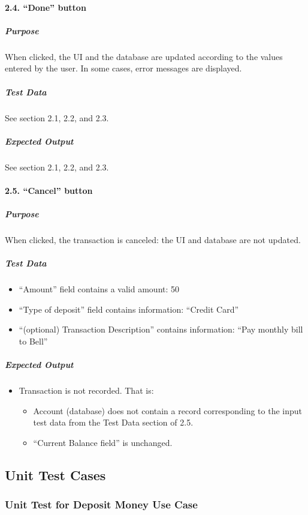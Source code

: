 \documentclass[12pt]{article}
\begin{document}
\paragraph{2.4. “Done” button}

\subparagraph{Purpose} When clicked, the UI and the database are updated according to the values entered by the user. In some cases, error messages are displayed.
 
\subparagraph{Test Data}
See section 2.1, 2.2, and 2.3.
 
\subparagraph{Expected Output}
See section 2.1, 2.2, and 2.3.
 
\paragraph{2.5. “Cancel” button}
 
\subparagraph{Purpose} When clicked, the transaction is canceled: the UI and database are not updated.
 
\subparagraph{Test Data}
\begin{itemize}
  \item “Amount” field contains a valid amount: 50
  \item “Type of deposit” field contains information: “Credit Card”
  \item “(optional) Transaction Description” contains information: “Pay monthly bill to Bell”
 \end{itemize}

\subparagraph{Expected Output}
\begin{itemize}
  \item Transaction is not recorded. That is:
\begin{itemize}
  \item Account (database) does not contain a record corresponding to the input test data from the Test Data section of 2.5.
  \item “Current Balance field” is unchanged.
\end{itemize}
\end{itemize}

\subsection{Unit Test Cases}

\subsubsection{Unit Test for Deposit Money Use Case}
\end{document}
